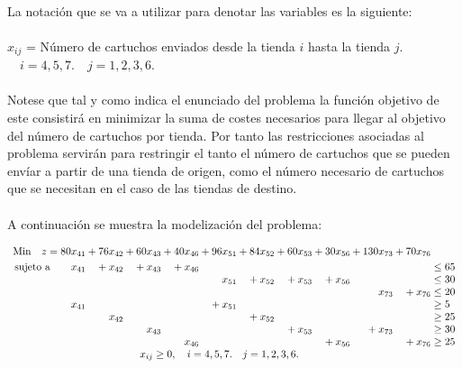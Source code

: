 \documentclass[10pt, a4paper]{article}
\begin{document}
			\paragraph{}
			La notación que se va a utilizar para denotar las variables es la siguiente:
			\paragraph{}
			\(x_{ij}\) = Número de cartuchos enviados desde la tienda \(i\) hasta la tienda \(j\). \(\quad i=4,5,7. \quad j=1,2,3,6.\)

			\paragraph{}
			Notese que tal y como indica el enunciado del problema la función objetivo de este consistirá en minimizar la suma de costes necesarios para llegar al objetivo del número de cartuchos por tienda. Por tanto las restricciones asociadas al problema servirán para restringir el tanto el número de cartuchos que se pueden envíar a partir de una tienda de origen, como el número necesario de cartuchos que se necesitan en el caso de las tiendas de destino.

			\paragraph{}
			A continuación se muestra la modelización del problema:

			\[
			  \begin{array}{r@{}r@{}r@{}r@{}r@{}r@{}r@{}r@{}r@{}r@{}l}
			    \text{Min} \quad z=	80x_{41} &{} + 76x_{42} &{} + 60x_{43} &{} + 40x_{46} &{} + 96x_{51} &{} + 84x_{52} &{} + 60x_{53} &{} + 30x_{56} &{} + 130x_{73} &{} + 70x_{76} &{} \\[\jot]
			    \text{sujeto a}\qquad 	x_{41} &{} +   x_{42} &{} +   x_{43} &{} +   x_{46} &{}   &{}   &{}   &{}   &{}   &{}   &{} \leq 65 \\
			                     	&{}  &{}  &{}  &{} x_{51} &{} + x_{52} &{} + x_{53} &{} + x_{56} &{}  &{}  &{} \leq 30 \\
								 	&{} &{}  &{}  &{}  &{} &{}  &{}  &{} x_{73} &{} + x_{76} &{} \leq 20 \\
								 	x_{41} &{} &{} &{} &{} + x_{51} &{} &{}  &{}  &{} &{}  &{} \geq 5 \\
								 	&{}  x_{42} &{}  &{} &{}  &{} + x_{52} &{}  &{}  &{} &{}  &{} \geq 25 \\
								 	 &{}  &{}  x_{43} &{}  &{}  &{}  &{} + x_{53} &{}  &{} + x_{73} &{}  &{} \geq 30 \\
								 	&{}  &{}  &{} x_{46} &{}  &{}  &{}  &{} + x_{56} &{}  &{} + x_{76} &{} \geq 25 \\
			     \multicolumn{10}{c}{x_{ij} \geq 0, \quad i=4,5,7. \quad j=1,2,3,6.}
			  \end{array}
			\]
\end{document}
